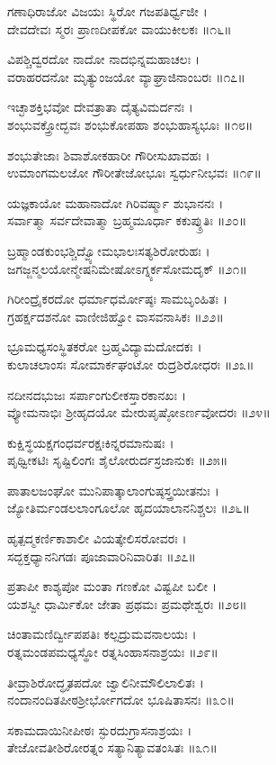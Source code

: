 ಗಣಾಧಿರಾಜೋ ವಿಜಯಃ ಸ್ಥಿರೋ ಗಜಪತಿರ್ಧ್ವಜೀ ।\\
ದೇವದೇವಃ ಸ್ಮರಃ ಪ್ರಾಣದೀಪಕೋ ವಾಯುಕೀಲಕಃ ॥೧೬॥

ವಿಪಶ್ಚಿದ್ವರದೋ ನಾದೋ ನಾದಭಿನ್ನಮಹಾಚಲಃ ।\\
ವರಾಹರದನೋ ಮೃತ್ಯುಂಜಯೋ ವ್ಯಾಘ್ರಾಜಿನಾಂಬರಃ ॥೧೭॥

ಇಚ್ಛಾಶಕ್ತಿಭವೋ ದೇವತ್ರಾತಾ ದೈತ್ಯವಿಮರ್ದನಃ ।\\
ಶಂಭುವಕ್ತ್ರೋದ್ಭವಃ ಶಂಭುಕೋಪಹಾ ಶಂಭುಹಾಸ್ಯಭೂಃ ॥೧೮॥

ಶಂಭುತೇಜಾಃ ಶಿವಾಶೋಕಹಾರೀ ಗೌರೀಸುಖಾವಹಃ ।\\
ಉಮಾಂಗಮಲಜೋ ಗೌರೀತೇಜೋಭೂಃ ಸ್ವರ್ಧುನೀಭವಃ ॥೧೯॥

ಯಜ್ಞಕಾಯೋ ಮಹಾನಾದೋ ಗಿರಿವರ್ಷ್ಮಾ ಶುಭಾನನಃ ।\\
ಸರ್ವಾತ್ಮಾ ಸರ್ವದೇವಾತ್ಮಾ ಬ್ರಹ್ಮಮೂರ್ಧಾ ಕಕುಪ್ಶ್ರುತಿಃ ॥೨೦॥

ಬ್ರಹ್ಮಾಂಡಕುಂಭಶ್ಚಿದ್ವ್ಯೋಮಭಾಲಃಸತ್ಯಶಿರೋರುಹಃ ।\\
ಜಗಜ್ಜನ್ಮಲಯೋನ್ಮೇಷನಿಮೇಷೋಽಗ್ನ್ಯರ್ಕಸೋಮದೃಕ್ ॥೨೧॥

ಗಿರೀಂದ್ರೈಕರದೋ ಧರ್ಮಾಧರ್ಮೋಷ್ಠಃ ಸಾಮಬೃಂಹಿತಃ ।\\
ಗ್ರಹರ್ಕ್ಷದಶನೋ ವಾಣೀಜಿಹ್ವೋ ವಾಸವನಾಸಿಕಃ ॥೨೨॥

ಭ್ರೂಮಧ್ಯಸಂಸ್ಥಿತಕರೋ ಬ್ರಹ್ಮವಿದ್ಯಾಮದೋದಕಃ ।\\
ಕುಲಾಚಲಾಂಸಃ ಸೋಮಾರ್ಕಘಂಟೋ ರುದ್ರಶಿರೋಧರಃ ॥೨೩॥

ನದೀನದಭುಜಃ ಸರ್ಪಾಂಗುಲೀಕಸ್ತಾರಕಾನಖಃ ।\\
ವ್ಯೋಮನಾಭಿಃ ಶ್ರೀಹೃದಯೋ ಮೇರುಪೃಷ್ಠೋಽರ್ಣವೋದರಃ ॥೨೪॥

ಕುಕ್ಷಿಸ್ಥಯಕ್ಷಗಂಧರ್ವರಕ್ಷಃಕಿನ್ನರಮಾನುಷಃ ।\\
ಪೃಥ್ವೀಕಟಿಃ ಸೃಷ್ಟಿಲಿಂಗಃ ಶೈಲೋರುರ್ದಸ್ರಜಾನುಕಃ ॥೨೫॥

ಪಾತಾಲಜಂಘೋ ಮುನಿಪಾತ್ಕಾಲಾಂಗುಷ್ಠಸ್ತ್ರಯೀತನುಃ ।\\
ಜ್ಯೋತಿರ್ಮಂಡಲಲಾಂಗೂಲೋ ಹೃದಯಾಲಾನನಿಶ್ಚಲಃ ॥೨೬॥

ಹೃತ್ಪದ್ಮಕರ್ಣಿಕಾಶಾಲೀ ವಿಯತ್ಕೇಲಿಸರೋವರಃ ।\\
ಸದ್ಭಕ್ತಧ್ಯಾನನಿಗಡಃ ಪೂಜಾವಾರಿನಿವಾರಿತಃ ॥೨೭॥

ಪ್ರತಾಪೀ ಕಾಶ್ಯಪೋ ಮಂತಾ ಗಣಕೋ ವಿಷ್ಟಪೀ ಬಲೀ ।\\
ಯಶಸ್ವೀ ಧಾರ್ಮಿಕೋ ಜೇತಾ ಪ್ರಥಮಃ ಪ್ರಮಥೇಶ್ವರಃ ॥೨೮॥

ಚಿಂತಾಮಣಿರ್ದ್ವೀಪಪತಿಃ ಕಲ್ಪದ್ರುಮವನಾಲಯಃ ।\\
ರತ್ನಮಂಡಪಮಧ್ಯಸ್ಥೋ ರತ್ನಸಿಂಹಾಸನಾಶ್ರಯಃ ॥೨೯॥

ತೀವ್ರಾಶಿರೋದ್ಧೃತಪದೋ ಜ್ವಾಲಿನೀಮೌಲಿಲಾಲಿತಃ ।\\
ನಂದಾನಂದಿತಪೀಠಶ್ರೀರ್ಭೋಗದೋ ಭೂಷಿತಾಸನಃ ॥೩೦॥

ಸಕಾಮದಾಯಿನೀಪೀಠಃ ಸ್ಫುರದುಗ್ರಾಸನಾಶ್ರಯಃ ।\\
ತೇಜೋವತೀಶಿರೋರತ್ನಂ ಸತ್ಯಾನಿತ್ಯಾವತಂಸಿತಃ ॥೩೧॥

